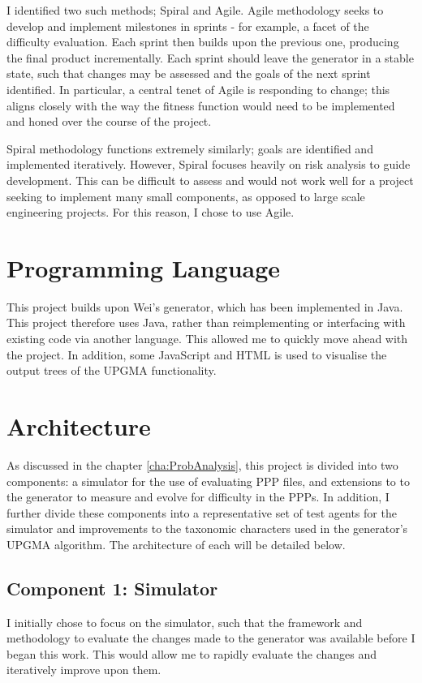 \documentclass[authoryearcitations]{UoYCSproject}
\begin{document}
I identified two such methods; Spiral and Agile. Agile methodology \cite{agile} seeks to develop and implement milestones in sprints - for example, a facet of the difficulty evaluation. Each sprint then builds upon the previous one, producing the final product incrementally. Each sprint should leave the generator in a stable state, such that changes may be assessed and the goals of the next sprint identified. In particular, a central tenet of Agile is responding to change; this aligns closely with the way the fitness function would need to be implemented and honed over the course of the project.

Spiral methodology \cite{spiral} functions extremely similarly; goals are identified and implemented iteratively. However, Spiral focuses heavily on risk analysis to guide development. This can be difficult to assess and would not work well for a project seeking to implement many small components, as opposed to large scale engineering projects. For this reason, I chose to use Agile.


\section{Programming Language}
\label{sec:da_2}

This project builds upon Wei's generator, which has been implemented in Java. This project therefore uses Java, rather than reimplementing or interfacing with existing code via another language. This allowed me to quickly move ahead with the project. In addition, some JavaScript and HTML is used to visualise the output trees of the UPGMA functionality.


\section{Architecture}
\label{sec:da_3}

As discussed in the chapter \ref{cha:ProbAnalysis}, this project is divided into two components: a simulator for the use of evaluating PPP files, and extensions to to the generator to measure and evolve for difficulty in the PPPs. In addition, I further divide these components into a representative set of test agents for the simulator and improvements to the taxonomic characters used in the generator's UPGMA algorithm. The architecture of each will be detailed below.

\subsection{Component 1: Simulator}
\label{sec:da_3_1}
I initially chose to focus on the simulator, such that the framework and methodology to evaluate the changes made to the generator was available before I began this work. This would allow me to rapidly evaluate the changes and iteratively improve upon them. 
\end{document}

